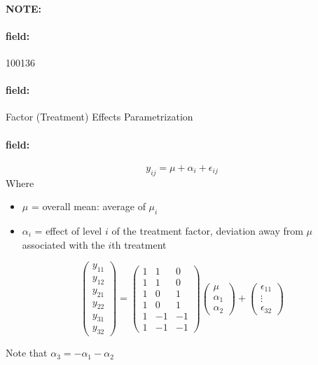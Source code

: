 \documentclass[12pt]{article}
\newenvironment{note}{\paragraph{NOTE:}}{}
\newenvironment{field}{\paragraph{field:}}{}
\begin{document}
\begin{note}
 \begin{field}
  \tiny 100136
 \end{field}
 \begin{field}
  Factor (Treatment) Effects Parametrization
 \end{field}
 \begin{field}
  $$ y_{ij} = \mu + \alpha_i + \epsilon_{ij}$$
  Where
  \begin{itemize}
   \item $\mu$ = overall mean: average of $\mu_i$
   \item $\alpha_i$ = effect of level $i$ of the treatment factor, deviation away from $\mu$ associated with the $i$th treatment
  \end{itemize}

  $$ \begin{pmatrix}
    y_{11} \\ y_{12} \\ y_{21} \\ y_{22} \\ y_{31} \\y_{32}
   \end{pmatrix}  = \begin{pmatrix}
    1 & 1  & 0  \\
    1 & 1  & 0  \\
    1 & 0  & 1  \\
    1 & 0  & 1  \\
    1 & -1 & -1 \\
    1 & -1 & -1
   \end{pmatrix} \begin{pmatrix}
    \mu \\ \alpha_1 \\ \alpha_2
   \end{pmatrix} + \begin{pmatrix}
    \epsilon_{11} \\ \vdots \\ \epsilon_{32}
   \end{pmatrix} $$

  Note that $\alpha_3 = -\alpha_1 - \alpha_2$
 \end{field}
\end{note}
\end{document}
